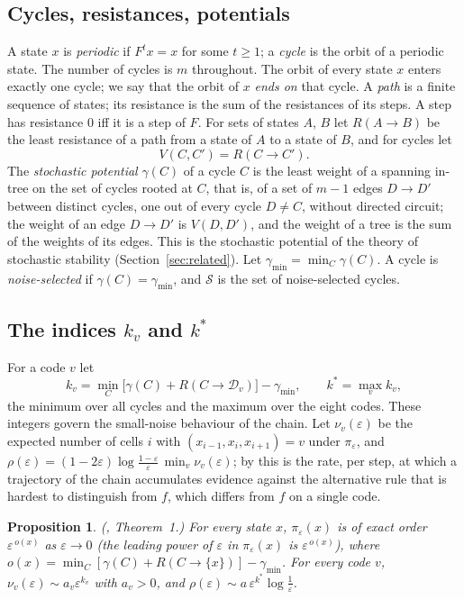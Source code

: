 \documentclass[10pt,a4paper]{article}
\newtheorem{proposition}[theorem]{Proposition}
\newcommand{\eps}{\varepsilon}
\newcommand{\gmin}{\gamma_{\min}}
\newcommand{\Sel}{\mathcal{S}}                %
\newcommand{\Dc}[1]{\mathcal{D}_{#1}}         %
\newcommand{\kst}{k^{*}}
\begin{document}
\subsection{Cycles, resistances, potentials}
A state $x$ is \emph{periodic} if $F^tx=x$ for some $t\ge1$; a \emph{cycle} is the orbit of a periodic state. The
number of cycles is $m$ throughout. The orbit of every state $x$ enters exactly one cycle; we
say that the orbit of $x$ \emph{ends on} that cycle. A \emph{path} is a finite sequence of states; its resistance is
the sum of the resistances of its steps. A step has resistance $0$ iff it is a step of $F$. For sets of states $A$, $B$
let $R(A\to B)$ be the least resistance of a path from a state of $A$ to a state of $B$, and for cycles let
\[
V(C,C')=R(C\to C').
\]
The \emph{stochastic potential} $\gamma(C)$ of a cycle $C$ is the least weight of a spanning in-tree on the set of
cycles rooted at $C$, that is, of a set of $m-1$ edges $D\to D'$ between distinct cycles, one out of every cycle
$D\ne C$, without directed circuit; the weight of an edge $D\to D'$ is $V(D,D')$, and the weight of a tree is the sum
of the weights of its edges. This is the stochastic potential of the theory of stochastic stability
(Section~\ref{sec:related}). Let $\gmin=\min_C\gamma(C)$. A cycle is
\emph{noise-selected} if $\gamma(C)=\gmin$, and $\Sel$ is the set of noise-selected cycles.

\subsection{The indices \texorpdfstring{$k_v$ and $\kst$}{k\_v and k*}}
For a code $v$ let
\begin{equation}\label{eq:kv}
k_v=\min_{C}\bigl[\gamma(C)+R(C\to\Dc{v})\bigr]-\gmin ,\qquad \kst=\max_{v}k_v ,
\end{equation}
the minimum over all cycles and the maximum over the eight codes. These integers govern the small-noise behaviour of
the chain. Let $\nu_v(\eps)$ be the expected number of cells $i$ with $(x_{i-1},x_i,x_{i+1})=v$ under $\pi_\eps$, and
$\rho(\eps)=(1-2\eps)\log\frac{1-\eps}{\eps}\,\min_v\nu_v(\eps)$; by \cite{PeterleinNote} this is the rate, per
step, at which a trajectory of the chain accumulates evidence against the alternative rule that is hardest to
distinguish from $f$, which differs from $f$ on a single code.

\begin{proposition}\label{prop:order}
\textup{(\cite{PeterleinNote}, Theorem~1.)} For every state $x$, $\pi_\eps(x)$ is of exact order $\eps^{\,o(x)}$ as $\eps\to0$ (the leading power of $\eps$ in
$\pi_\eps(x)$ is $\eps^{\,o(x)}$), where $o(x)=\min_C[\gamma(C)+R(C\to\{x\})]-\gmin$. For every code $v$, $\nu_v(\eps)\sim a_v\eps^{k_v}$ with $a_v>0$, and
$\rho(\eps)\sim a\,\eps^{\kst}\log\frac1\eps$.
\end{proposition}
\end{document}
